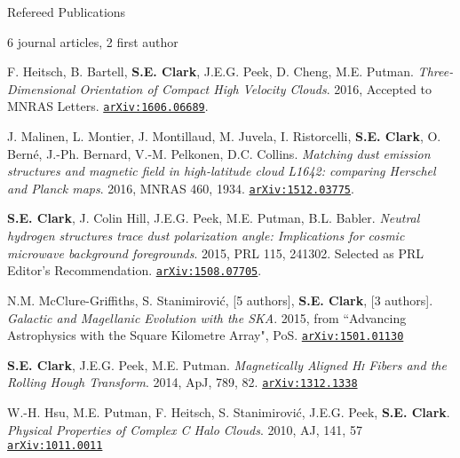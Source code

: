 \documentclass{resume_clark} %
\begin{document}
\begin{rSection}{Refereed Publications}

6 journal articles, 2 first author

\begin{etaremune}

\item F. Heitsch, B. Bartell, {\bf S.E. Clark}, J.E.G. Peek, D. Cheng, M.E. Putman. \textit{Three-Dimensional Orientation of Compact High Velocity Clouds}. 2016, Accepted to MNRAS Letters. \href{http://arxiv.org/abs/1606.06689}{\tt arXiv:1606.06689}.

\item J. Malinen, L. Montier, J. Montillaud, M. Juvela, I. Ristorcelli, {\bf S.E. Clark}, O. Bern\'e, J.-Ph. Bernard, V.-M. Pelkonen, D.C. Collins. \textit{Matching dust emission structures and magnetic field in high-latitude cloud L1642: comparing Herschel and Planck maps}. 2016, MNRAS 460, 1934. \href{http://arxiv.org/abs/1512.03775}{\tt arXiv:1512.03775}. 

\item {\bf S.E. Clark}, J. Colin Hill, J.E.G. Peek, M.E. Putman, B.L. Babler. \textit{Neutral hydrogen structures trace dust polarization angle: Implications for cosmic microwave background foregrounds}. 2015, PRL 115, 241302. Selected as PRL Editor's Recommendation. \href{http://arxiv.org/abs/1508.07005}{\tt arXiv:1508.07705}. 

\item N.M. McClure-Griffiths, S. Stanimirovi\' c, [5 authors], {\bf S.E. Clark}, [3 authors]. \textit{Galactic and Magellanic Evolution with the SKA}. 2015, from ``Advancing Astrophysics with the Square Kilometre Array", PoS. \href{http://arxiv.org/abs/1501.01130}{\tt arXiv:1501.01130}

\item {\bf S.E. Clark}, J.E.G. Peek, M.E. Putman. {\em Magnetically Aligned {\textit{\textsc{Hi}}} Fibers and the Rolling Hough Transform}. 2014, {ApJ, 789, 82}. \href{http://arxiv.org/abs/1312.1338}{\tt arXiv:1312.1338}

\item W.-H. Hsu, M.E. Putman, F. Heitsch, S. Stanimirovi\' c, J.E.G. Peek, {\bf S.E. Clark}. {\em Physical Properties of Complex C Halo Clouds}. 2010, {AJ, 141, 57} \href{http://fr.arxiv.org/abs/1011.0011}{\tt arXiv:1011.0011}\\
\end{etaremune}

\end{rSection}
\end{document}
